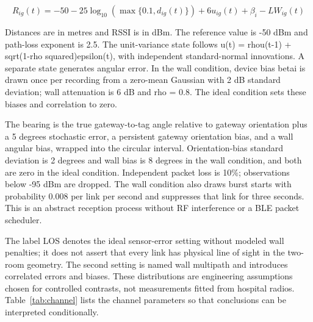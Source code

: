 \documentclass[12pt,a4paper]{report}
\begin{document}
\begin{equation}
R_{ig}(t)=-50-25\log_{10}(\max\{0.1,d_{ig}(t)\})+6u_{ig}(t)+\beta_i-LW_{ig}(t)
\label{eq:source2}
\end{equation}

Distances are in metres and RSSI is in dBm. The reference value is -50 dBm and path-loss exponent is 2.5. The unit-variance state follows u(t) = rhou(t-1) + sqrt(1-rho squared)epsilon(t), with independent standard-normal innovations. A separate state generates angular error. In the wall condition, device bias betai is drawn once per recording from a zero-mean Gaussian with 2 dB standard deviation; wall attenuation is 6 dB and rho = 0.8. The ideal condition sets these biases and correlation to zero.

The bearing is the true gateway-to-tag angle relative to gateway orientation plus a 5 degrees stochastic error, a persistent gateway orientation bias, and a wall angular bias, wrapped into the circular interval. Orientation-bias standard deviation is 2 degrees and wall bias is 8 degrees in the wall condition, and both are zero in the ideal condition. Independent packet loss is 10\%; observations below -95 dBm are dropped. The wall condition also draws burst starts with probability 0.008 per link per second and suppresses that link for three seconds. This is an abstract reception process without RF interference or a BLE packet scheduler.

The label LOS denotes the ideal sensor-error setting without modeled wall penalties; it does not assert that every link has physical line of sight in the two-room geometry. The second setting is named wall multipath and introduces correlated errors and biases. These distributions are engineering assumptions chosen for controlled contrasts, not measurements fitted from hospital radios. Table~\ref{tab:channel} lists the channel parameters so that conclusions can be interpreted conditionally.
\end{document}

